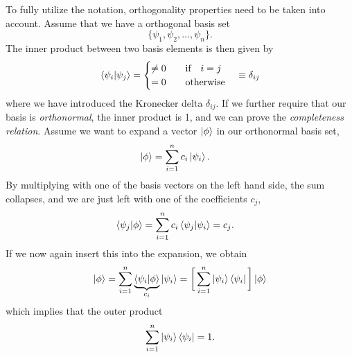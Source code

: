 To fully utilize the notation, orthogonality properties need to be taken into account. Assume that we have a orthogonal basis set 
\begin{equation}
\{\psi_1,\psi_2,\hdots,\psi_n\}.
\end{equation}
The inner product between two basis elements is then given by
\begin{equation}
\braket{\psi_i}{\psi_j}=
\begin{cases}
\neq 0\quad&\text{if}\quad i=j\\
=0\quad&\text{otherwise}
\end{cases}
\quad\equiv\delta_{ij}
\end{equation}
where we have introduced the Kronecker delta $\delta_{ij}$. If we further require that our basis is \textit{orthonormal}, the inner product is 1, and we can prove the \textit{completeness relation}. Assume we want to expand a vector $\ket{\phi}$ in our orthonormal basis set,
\begin{align}
\ket{\phi}&=\sum_{i=1}^nc_i\ket{\psi_i}.
\end{align}
By multiplying with one of the basis vectors on the left hand side, the sum collapses, and we are just left with one of the coefficients $c_j$,
\begin{align}
\braket{\psi_j}{\phi} &= \sum_{i=1}^nc_i\braket{\psi_j}{\psi_i}=c_j.
\end{align}
If we now again insert this into the expansion, we obtain
\begin{equation}
\ket{\phi}=\sum_{i=1}^n\underbrace{\braket{\psi_i}{\phi}}_{c_i}\ket{\psi_i}=\bigg[\sum_{i=1}^n\ket{\psi_i}\bra{\psi_i}\bigg]\ket{\phi}
\end{equation}
which implies that the outer product
\begin{equation}
\sum_{i=1}^n\ket{\psi_i}\bra{\psi_i}=1.
\end{equation}

